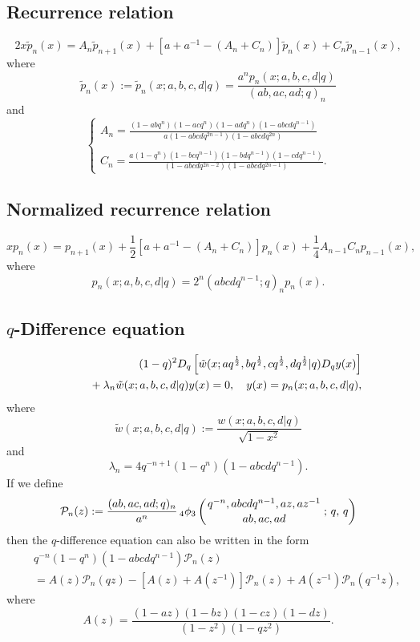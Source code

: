 \documentclass[envcountchap,graybox]{svmono}
\newcommand{\qhyp}[5]{\mbox{}_{#1}{\phi}_{#2}
\left(\genfrac{}{}{0pt}{}{#3}{#4}\,;\,q,\,#5\right)}
\newcommand{\mathindent}{\hspace{7.5mm}}
\begin{document}
\subsection*{Recurrence relation}
\begin{equation}
\label{RecAskeyWilson}
2x{\tilde p}_n(x)=A_n{\tilde p}_{n+1}(x)+\left[a+a^{-1}-\left(A_n+C_n\right)\right]{\tilde p}_n(x)+C_n{\tilde p}_{n-1}(x),
\end{equation}
where
$${\tilde p}_n(x):={\tilde p}_n(x;a,b,c,d|q)=\frac{a^np_n(x;a,b,c,d|q)}{(ab,ac,ad;q)_n}$$
and
$$\left\{\begin{array}{l}
\displaystyle A_n=\frac{(1-abq^n)(1-acq^n)(1-adq^n)(1-abcdq^{n-1})}{a(1-abcdq^{2n-1})(1-abcdq^{2n})}\\
\\
\displaystyle C_n=\frac{a(1-q^n)(1-bcq^{n-1})(1-bdq^{n-1})(1-cdq^{n-1})}{(1-abcdq^{2n-2})(1-abcdq^{2n-1})}.
\end{array}\right.$$

\subsection*{Normalized recurrence relation}
\begin{equation}
\label{NormRecAskeyWilson}
xp_n(x)=p_{n+1}(x)+\frac{1}{2}\left[a+a^{-1}-(A_n+C_n)\right]p_n(x)+
\frac{1}{4}A_{n-1}C_np_{n-1}(x),
\end{equation}
where
$$p_n(x;a,b,c,d|q)=2^n(abcdq^{n-1};q)_np_n(x).$$

\subsection*{$q$-Difference equation}
\begin{eqnarray}
\label{dvAskeyWilson1}
& &(1-q)^2D_q\left[{\tilde w}(x;aq^{\frac{1}{2}},bq^{\frac{1}{2}},
cq^{\frac{1}{2}},dq^{\frac{1}{2}}|q)D_qy(x)\right]\nonumber\\
& &{}\mathindent{}+\lambda_n{\tilde w}(x;a,b,c,d|q)y(x)=0,\quad y(x)=p_n(x;a,b,c,d|q),
\end{eqnarray}
where
$${\tilde w}(x;a,b,c,d|q):=\frac{w(x;a,b,c,d|q)}{\sqrt{1-x^2}}$$
and
$$\lambda_n=4q^{-n+1}(1-q^n)(1-abcdq^{n-1}).$$
If we define
$${\mathcal P}_n(z):=\frac{(ab,ac,ad;q)_n}{a^n}\,\qhyp{4}{3}{q^{-n},abcdq^{n-1},az,az^{-1}}{ab,ac,ad}{q}$$
then the $q$-difference equation can also be written in the form
\begin{eqnarray}
\label{dvAskeyWilson2}
& &q^{-n}(1-q^n)(1-abcdq^{n-1}){\mathcal P}_n(z)\nonumber\\
& &{}=A(z){\mathcal P}_n(qz)-\left[A(z)+A(z^{-1})\right]{\mathcal P}_n(z)+A(z^{-1}){\mathcal P}_n(q^{-1}z),
\end{eqnarray}
where
$$A(z)=\frac{(1-az)(1-bz)(1-cz)(1-dz)}{(1-z^2)(1-qz^2)}.$$
\end{document}
